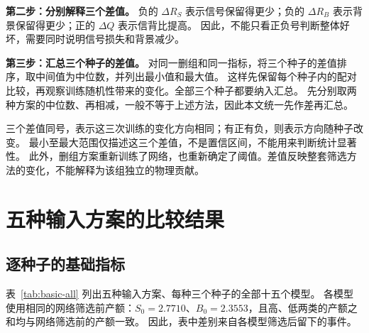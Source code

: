 \documentclass[11pt,a4paper,fontset=fandol,scheme=plain]{ctexart}
\begin{document}
\textbf{第二步：分别解释三个差值。}
负的 $\Delta R_S$ 表示信号保留得更少；负的 $\Delta R_B$ 表示背景保留得更少；正的 $\Delta Q$ 表示信背比提高。
因此，不能只看正负号判断整体好坏，需要同时说明信号损失和背景减少。

\textbf{第三步：汇总三个种子的差值。}
对同一删组和同一指标，将三个种子的差值排序，取中间值为中位数，并列出最小值和最大值。
这样先保留每个种子内的配对比较，再观察训练随机性带来的变化。全部三个种子都要纳入汇总。
先分别取两种方案的中位数、再相减，一般不等于上述方法，因此本文统一先作差再汇总。

三个差值同号，表示这三次训练的变化方向相同；有正有负，则表示方向随种子改变。
最小至最大范围仅描述这三个差值，不是置信区间，不能用来判断统计显著性。
此外，删组方案重新训练了网络，也重新确定了阈值。差值反映整套筛选方法的变化，不能解释为该组独立的物理贡献。


\FloatBarrier
{}
\section{五种输入方案的比较结果}

\subsection{逐种子的基础指标}
表~\ref{tab:basic-all} 列出五种输入方案、每种三个种子的全部十五个模型。
各模型使用相同的网络筛选前产额：$S_0=2.7710$、$B_0=2.3553$，且高、低两类的产额之和均与网络筛选前的产额一致。
因此，表中差别来自各模型筛选后留下的事件。
\end{document}
